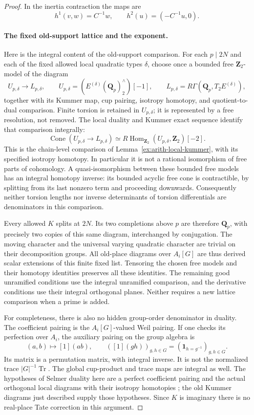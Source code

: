 \documentclass[11pt]{article}
\theoremstyle{definition}
\theoremstyle{remark}
\begin{document}
\begin{proof}
In the inertia contraction the maps are
\[
 h^1(v,w)=C^{-1}w,\qquad h^2(u)=(-C^{-1}u,0).
\]
\paragraph{The fixed old-support lattice and the exponent.}
Here is the integral content of the old-support comparison.  For each
$p\mid2N$ and each of the fixed allowed local quadratic types $\delta$,
choose once a bounded free $\mathbf Z_2$-model of the diagram
\[
 U_{p,\delta}\longrightarrow L_{p,\delta},\qquad
 U_{p,\delta}=(E^{(\delta)}(\mathbf Q_p)^\wedge_2)[-1],\qquad
 L_{p,\delta}=R\Gamma(\mathbf Q_p,T_2E^{(\delta)}),
\]
together with its Kummer map, cup pairing, isotropy homotopy, and
quotient-to-dual comparison.  Finite torsion is retained in $U_{p,\delta}$;
it is represented by a free resolution, not removed.  The local
duality and Kummer exact sequence identify that comparison integrally:
\[
 \operatorname{Cone}(U_{p,\delta}\to L_{p,\delta})
       \simeq R\operatorname{Hom}_{\mathbf Z_2}
                         (U_{p,\delta},\mathbf Z_2)[-2].
\]
This is the chain-level comparison of
Lemma~\ref{ex:arith-local-kummer}, with its specified isotropy
homotopy.  In particular it is not a rational isomorphism of free
parts of cohomology.  A quasi-isomorphism between these bounded free
models has an integral homotopy inverse: its bounded acyclic free
cone is contractible, by splitting from its last nonzero term
and proceeding downwards.  Consequently neither torsion lengths
nor inverse determinants of torsion differentials are denominators
in this comparison.

Every allowed $K$ splits at $2N$.  Its two completions above $p$ are
therefore $\mathbf Q_p$, with precisely two copies of this same
diagram, interchanged by conjugation.  The moving character and
the universal varying quadratic character are trivial on their
decomposition groups.  All old-place diagrams over $A_i[G]$ are thus
derived scalar extensions of this finite fixed list.  Tensoring the
chosen free models and their homotopy identities preserves all these
identities.  The remaining good unramified conditions use the
integral unramified comparison, and the derivative conditions use
their integral orthogonal planes.  Neither requires a new lattice
comparison when a prime is added.

For completeness, there is also no hidden group-order denominator in
duality.  The coefficient pairing is the $A_i[G]$-valued Weil pairing.
If one checks its perfection over $A_i$, the auxiliary pairing on the
group algebra is
\[
 (a,b)\longmapsto[1](ab),\qquad
 ([1](gh))_{g,h\in G}=(\mathbf1_{h=g^{-1}})_{g,h\in G}.
\]
Its matrix is a permutation matrix, with integral inverse.  It is not
the normalized trace $|G|^{-1}\operatorname{Tr}$.  The global
cup-product and trace maps are integral as well.  The hypotheses of
Selmer duality here are a perfect coefficient pairing and the actual
orthogonal local diagrams with their isotropy homotopies
\cite[Sections 6.2.5--6.2.8 and Theorem 6.3.4]{nekovar}; the old
Kummer diagrams just described supply those hypotheses.  Since $K$
is imaginary there is no real-place Tate correction in this argument.


\end{proof}
\end{document}
